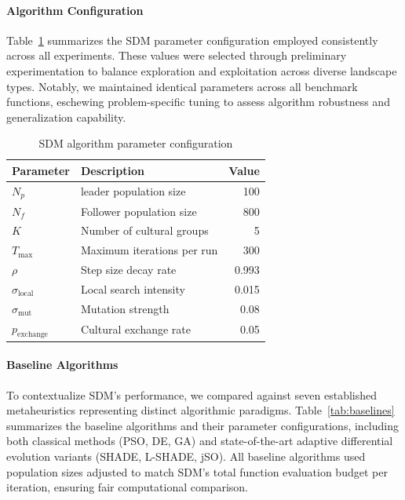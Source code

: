 \documentclass[11pt]{article}
\begin{document}
\paragraph{Algorithm Configuration} Table~\ref{tab:sdm_config} summarizes the SDM parameter configuration employed consistently across all experiments. These values were selected through preliminary experimentation to balance exploration and exploitation across diverse landscape types. Notably, we maintained identical parameters across all benchmark functions, eschewing problem-specific tuning to assess algorithm robustness and generalization capability.

\begin{table}[ht]
\centering
\caption{SDM algorithm parameter configuration}
\label{tab:sdm_config}
\small
\begin{tabular}{@{}llr@{}}
\toprule
Parameter & Description & Value \\
\midrule
$N_p$ & leader population size & 100 \\
$N_f$ & Follower population size & 800 \\
$K$ & Number of cultural groups & 5 \\
$T_{\max}$ & Maximum iterations per run & 300 \\
$\rho$ & Step size decay rate & 0.993 \\
$\sigma_{\text{local}}$ & Local search intensity & 0.015 \\
$\sigma_{\text{mut}}$ & Mutation strength & 0.08 \\
$p_{\text{exchange}}$ & Cultural exchange rate & 0.05 \\
\bottomrule
\end{tabular}
\end{table}

\paragraph{Baseline Algorithms} To contextualize SDM's performance, we compared against seven established metaheuristics representing distinct algorithmic paradigms. Table~\ref{tab:baselines} summarizes the baseline algorithms and their parameter configurations, including both classical methods (PSO, DE, GA) and state-of-the-art adaptive differential evolution variants (SHADE, L-SHADE, jSO). All baseline algorithms used population sizes adjusted to match SDM's total function evaluation budget per iteration, ensuring fair computational comparison.
\end{document}
